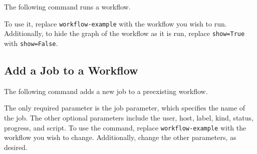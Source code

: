 The following command runs a workflow.

To use it, replace \texttt{workflow-example} with the workflow you wish
to run. Additionally, to hide the graph of the workflow as it is run,
replace \texttt{show=True} with \texttt{show=False}.

\begin{Shaded}
\begin{Highlighting}[]
   \DataTypeTok{\textbackslash{}}
     \DataTypeTok{\textbackslash{}}
     
\end{Highlighting}
\end{Shaded}

\subsection{Add a Job to a Workflow}\label{add-a-job-to-a-workflow}

The following command adds a new job to a preexisting workflow.

The only required parameter is the job parameter, which specifies the
name of the job. The other optional parameters include the user, host,
label, kind, status, progress, and script. To use the command, replace
\texttt{workflow-example} with the workflow you wish to change.
Additionally, change the other parameters, as desired.

\begin{Shaded}
\begin{Highlighting}[]
   \DataTypeTok{\textbackslash{}}
     \DataTypeTok{\textbackslash{}}
     
\end{Highlighting}
\end{Shaded}
